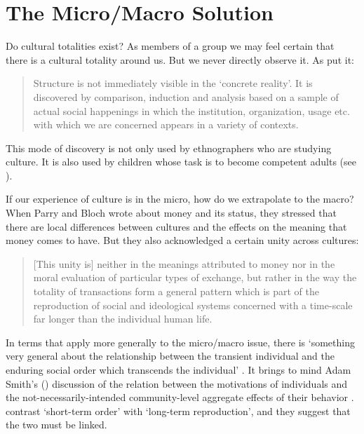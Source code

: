 
\chapter{The Micro/Macro Solution}
\label{micromacrosolution}

Do cultural totalities exist? As members of a group we may feel certain that 
there is a cultural totality around us. But we never directly observe it. As 
\citet[56]{fortes_social_1949} put it:

\begin{quotation}
Structure is not immediately visible in the \textquoteleft concrete 
reality'. It is discovered by comparison, induction and analysis based 
on a sample of actual social happenings in which the institution, 
organization, usage etc. with which we are concerned appears in a 
variety of contexts.
\end{quotation}

This mode of discovery is not only used by ethnographers who are studying culture. It is also used by children whose task is to become competent adults (see \citealt{brown_language_2014}). 



If our experience of culture is in the micro, how do we 
extrapolate to the macro? When Parry and Bloch wrote about money 
and its status, they stressed that there are local differences between cultures and the 
effects on the meaning that money comes to have. But they also acknowledged a 
certain unity across cultures: 

\begin{quotation}
[This unity is] neither in the meanings 
attributed to money nor in the moral evaluation of particular types of 
exchange, but rather in the way the totality of transactions form a 
general pattern which is part of the reproduction of social and 
ideological systems concerned with a time-scale far longer than the 
individual human life. \citep[1]{parry_money_1989} 
\end{quotation}



In terms that apply more generally to the micro/macro issue, there is \textquoteleft something very general about the relationship between the 
transient individual and the enduring social order which transcends the 
individual' \citep[2]{parry_money_1989}. It brings to mind Adam Smith's (\citeyear[book 4, ch. 2]{smith_inquiry_1776}) discussion of the relation between the 
motivations of individuals and the not-necessarily-intended 
community-level aggregate effects of their behavior \citep{schelling_micromotives_1978,rogers_diffusion_2003,hedstrom_social_1998}. \citet[29]{parry_money_1989} contrast \textquoteleft short-term order' with \textquoteleft long-term reproduction', and they suggest that the two must be linked. 



